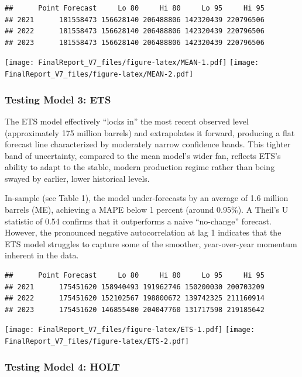 \documentclass[
]{article}
\begin{document}
\begin{verbatim}
##      Point Forecast     Lo 80     Hi 80     Lo 95     Hi 95
## 2021      181558473 156628140 206488806 142320439 220796506
## 2022      181558473 156628140 206488806 142320439 220796506
## 2023      181558473 156628140 206488806 142320439 220796506
\end{verbatim}

\texttt{[image: FinalReport\_V7\_files/figure-latex/MEAN-1.pdf]}
\texttt{[image: FinalReport\_V7\_files/figure-latex/MEAN-2.pdf]}

\subsubsection{Testing Model 3: ETS}\label{testing-model-3-ets}

The ETS model effectively ``locks in'' the most recent observed level
(approximately 175 million barrels) and extrapolates it forward,
producing a flat forecast line characterized by moderately narrow
confidence bands. This tighter band of uncertainty, compared to the mean
model's wider fan, reflects ETS's ability to adapt to the stable, modern
production regime rather than being swayed by earlier, lower historical
levels.

In-sample (see Table 1), the model under-forecasts by an average of 1.6
million barrels (ME), achieving a MAPE below 1 percent (around 0.95\%).
A Theil's U statistic of 0.54 confirms that it outperforms a naive
``no-change'' forecast. However, the pronounced negative autocorrelation
at lag 1 indicates that the ETS model struggles to capture some of the
smoother, year-over-year momentum inherent in the data.

\begin{verbatim}
##      Point Forecast     Lo 80     Hi 80     Lo 95     Hi 95
## 2021      175451620 158940493 191962746 150200030 200703209
## 2022      175451620 152102567 198800672 139742325 211160914
## 2023      175451620 146855480 204047760 131717598 219185642
\end{verbatim}

\texttt{[image: FinalReport\_V7\_files/figure-latex/ETS-1.pdf]}
\texttt{[image: FinalReport\_V7\_files/figure-latex/ETS-2.pdf]}

\subsubsection{Testing Model 4: HOLT}\label{testing-model-4-holt}
\end{document}
